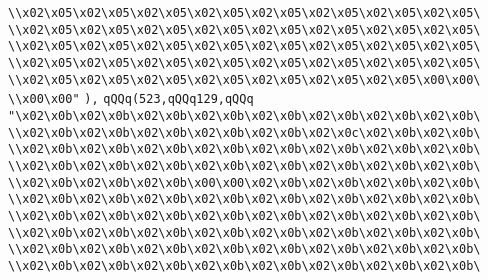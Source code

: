 \verb|\\x02\x05\x02\x05\x02\x05\x02\x05\x02\x05\x02\x05\x02\x05\x02\x05\|\newline
\verb|\\x02\x05\x02\x05\x02\x05\x02\x05\x02\x05\x02\x05\x02\x05\x02\x05\|\newline
\verb|\\x02\x05\x02\x05\x02\x05\x02\x05\x02\x05\x02\x05\x02\x05\x02\x05\|\newline
\verb|\\x02\x05\x02\x05\x02\x05\x02\x05\x02\x05\x02\x05\x02\x05\x02\x05\|\newline
\verb|\\x02\x05\x02\x05\x02\x05\x02\x05\x02\x05\x02\x05\x02\x05\x00\x00\|\newline
\verb|\\x00\x00"|\newline
\verb|),|\newline
\verb|qQQq(523,qQQq129,qQQq|\newline
\verb|"\x02\x0b\x02\x0b\x02\x0b\x02\x0b\x02\x0b\x02\x0b\x02\x0b\x02\x0b\|\newline
\verb|\\x02\x0b\x02\x0b\x02\x0b\x02\x0b\x02\x0b\x02\x0c\x02\x0b\x02\x0b\|\newline
\verb|\\x02\x0b\x02\x0b\x02\x0b\x02\x0b\x02\x0b\x02\x0b\x02\x0b\x02\x0b\|\newline
\verb|\\x02\x0b\x02\x0b\x02\x0b\x02\x0b\x02\x0b\x02\x0b\x02\x0b\x02\x0b\|\newline
\verb|\\x02\x0b\x02\x0b\x02\x0b\x00\x00\x02\x0b\x02\x0b\x02\x0b\x02\x0b\|\newline
\verb|\\x02\x0b\x02\x0b\x02\x0b\x02\x0b\x02\x0b\x02\x0b\x02\x0b\x02\x0b\|\newline
\verb|\\x02\x0b\x02\x0b\x02\x0b\x02\x0b\x02\x0b\x02\x0b\x02\x0b\x02\x0b\|\newline
\verb|\\x02\x0b\x02\x0b\x02\x0b\x02\x0b\x02\x0b\x02\x0b\x02\x0b\x02\x0b\|\newline
\verb|\\x02\x0b\x02\x0b\x02\x0b\x02\x0b\x02\x0b\x02\x0b\x02\x0b\x02\x0b\|\newline
\verb|\\x02\x0b\x02\x0b\x02\x0b\x02\x0b\x02\x0b\x02\x0b\x02\x0b\x02\x0b\|\newline
